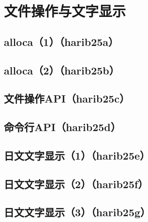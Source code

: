 ﻿\chapter{	文件操作与文字显示	}
\section{	alloca（1）（harib25a）	}
\section{	alloca（2）（harib25b）	}
\section{	文件操作API（harib25c）	}
\section{	命令行API（harib25d）	}
\section{	日文文字显示（1）（harib25e）	}
\section{	日文文字显示（2）（harib25f）	}
\section{	日文文字显示（3）（harib25g）	}


